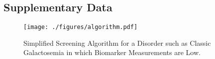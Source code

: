 \documentclass[review]{elsarticle}
\begin{document}
\subsection*{Supplementary Data}
\label{sec:orgabd8ed8}


\begin{figure}[htbp]
\centering
\texttt{[image: ./figures/algorithm.pdf]}
\caption{\label{fig:org73341f2}Simplified Screening Algorithm for a Disorder such as Classic Galactosemia in which Biomarker Measurements are Low.}
\end{figure}
\end{document}
